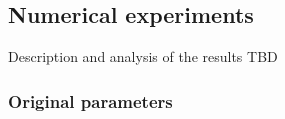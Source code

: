 \documentclass[11pt]{article}
\begin{document}
\subsection{Numerical experiments}
Description and analysis of the results TBD


\FloatBarrier
\subsubsection{Original parameters}
\end{document}
